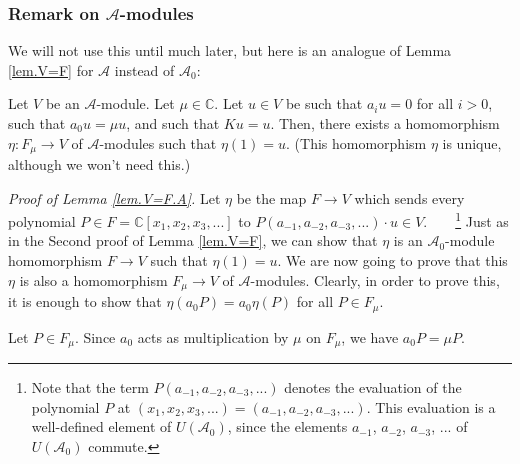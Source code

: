 \documentclass[etingof-lie.tex]{subfiles}
\begin{document}
\subsubsection{Remark on \texorpdfstring{$\mathcal{A}$}{A}-modules}

We will not use this until much later, but here is an analogue of Lemma
\ref{lem.V=F} for $\mathcal{A}$ instead of $\mathcal{A}_{0}$:

\begin{lemma}
\label{lem.V=F.A}Let $V$ be an $\mathcal{A}$-module. Let $\mu\in\mathbb{C}$.
Let $u\in V$ be such that $a_{i}u=0$ for all $i>0$, such that $a_{0}u=\mu u$,
and such that $Ku=u$. Then, there exists a homomorphism $\eta:F_{\mu
}\rightarrow V$ of $\mathcal{A}$-modules such that $\eta\left(  1\right)  =u$.
(This homomorphism $\eta$ is unique, although we won't need this.)
\end{lemma}

\textit{Proof of Lemma \ref{lem.V=F.A}.} Let $\eta$ be the map $F\rightarrow
V$ which sends every polynomial $P\in F=\mathbb{C}\left[  x_{1},x_{2}%
,x_{3},...\right]  $ to $P\left(  a_{-1},a_{-2},a_{-3},...\right)  \cdot u\in
V$.\ \ \ \ \footnote{Note that the term $P\left(  a_{-1},a_{-2},a_{-3}%
,...\right)  $ denotes the evaluation of the polynomial $P$ at $\left(
x_{1},x_{2},x_{3},...\right)  =\left(  a_{-1},a_{-2},a_{-3},...\right)  $.
This evaluation is a well-defined element of $U\left(  \mathcal{A}_{0}\right)
$, since the elements $a_{-1}$, $a_{-2}$, $a_{-3}$, $...$ of $U\left(
\mathcal{A}_{0}\right)  $ commute.} Just as in the Second proof of Lemma
\ref{lem.V=F}, we can show that $\eta$ is an $\mathcal{A}_{0}$-module
homomorphism $F\rightarrow V$ such that $\eta\left(  1\right)  =u$. We are now
going to prove that this $\eta$ is also a homomorphism $F_{\mu}\rightarrow V$
of $\mathcal{A}$-modules. Clearly, in order to prove this, it is enough to
show that $\eta\left(  a_{0}P\right)  =a_{0}\eta\left(  P\right)  $ for all
$P\in F_{\mu}$.

Let $P\in F_{\mu}$. Since $a_{0}$ acts as multiplication by $\mu$ on $F_{\mu}%
$, we have $a_{0}P=\mu P$.
\end{document}
